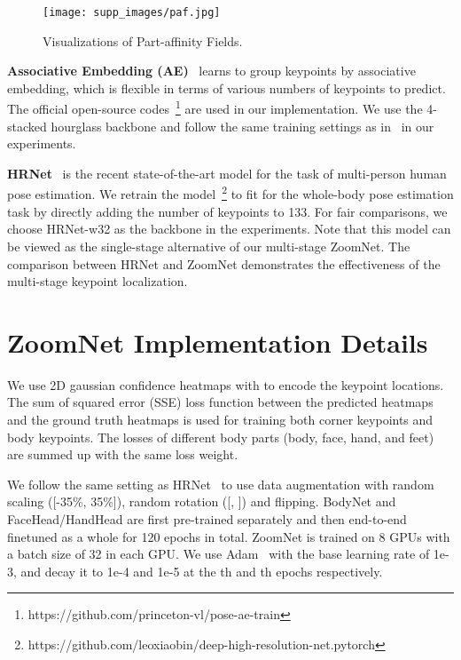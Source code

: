 \documentclass[runningheads]{llncs}
\begin{document}
	
	\begin{figure*}[tb]
		\centering
		\texttt{[image: supp\_images/paf.jpg]}
		\caption{Visualizations of Part-affinity Fields.}
		\label{fig:paf}
	\end{figure*}
	
	
	\textbf{Associative Embedding (AE)}~\cite{newell2017associative} learns to group keypoints by associative embedding, which is flexible in terms of various numbers of keypoints to predict. The official open-source codes~\footnote{https://github.com/princeton-vl/pose-ae-train} are used in our implementation. We use the 4-stacked hourglass backbone and follow the same training settings as in~\cite{newell2017associative} in our experiments. 
	
	\textbf{HRNet}~\cite{sun2019deep} is the recent state-of-the-art model for the task of multi-person human pose estimation. We retrain the model~\footnote{https://github.com/leoxiaobin/deep-high-resolution-net.pytorch} to fit for the whole-body pose estimation task by directly adding the number of keypoints to 133. For fair comparisons, we choose HRNet-w32 as the backbone in the experiments. Note that this model can be viewed as the single-stage alternative of our multi-stage ZoomNet. The comparison between HRNet and ZoomNet demonstrates the effectiveness of the multi-stage keypoint localization. 
	
	\section{ZoomNet Implementation Details}
	
	We use 2D gaussian confidence heatmaps with  to encode the keypoint locations.
	The sum of squared error (SSE) loss function between the predicted heatmaps and the ground truth heatmaps is used for training both corner keypoints and body keypoints. The losses of different body parts (body, face, hand, and feet) are summed up with the same loss weight.
	
	We follow the same setting as HRNet~\cite{sun2019deep} to use data augmentation with random scaling ([-35\%, 35\%]), random rotation ([, ]) and flipping. 
	BodyNet and FaceHead/HandHead are first pre-trained separately and then end-to-end finetuned as a whole for 120 epochs in total. ZoomNet is trained on 8 GPUs with a batch size of 32 in each GPU. We use Adam~\cite{kingma2014adam} with the base learning rate of 1e-3, and decay it to 1e-4 and 1e-5 at the th and th epochs respectively. 
	
\end{document}
